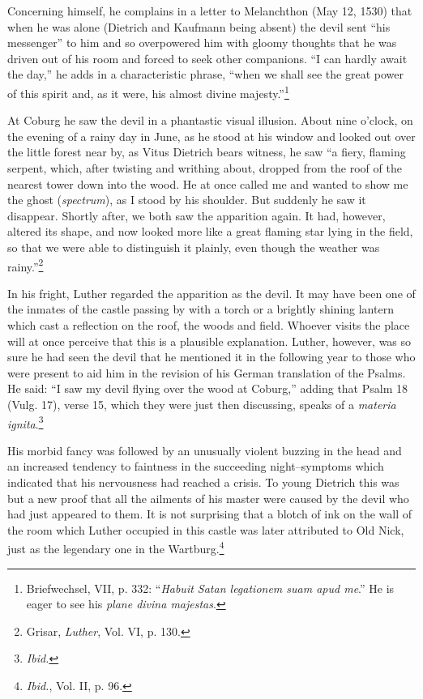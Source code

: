Concerning himself, he complains in a letter to Melanchthon (May
12, 1530) that when he was alone (Dietrich and Kaufmann being
absent) the devil sent “his messenger” to him and so overpowered him
with gloomy thoughts that he was driven out of his room and forced
to seek other companions. “I can hardly await the day,” he adds in a
characteristic phrase, “when we shall see the great power of this
spirit and, as it were, his almost divine majesty.”\footnote
{Briefwechsel, VII, p. 332: “\textit{Habuit Satan legationem suam apud me}.” He is eager to
see his \textit{plane divina majestas}.}

At Coburg he saw the devil in a phantastic visual illusion. About
nine o’clock, on the evening of a rainy day in June, as he stood at his
window and looked out over the little forest near by, as Vitus Dietrich
bears witness, he saw “a fiery, flaming serpent, which, after twisting
and writhing about, dropped from the roof of the nearest tower
down into the wood. He at once called me and wanted to show me
the ghost (\textit{spectrum}), as I stood by his shoulder. But suddenly he saw
it disappear. Shortly after, we both saw the apparition again. It had,
however, altered its shape, and now looked more like a great flaming
star lying in the field, so that we were able to distinguish it plainly,
even though the weather was rainy.”\footnote{Grisar, \textit{Luther}, Vol. VI, p. 130.}

In his fright, Luther regarded
the apparition as the devil. It may have been one of the inmates of the
castle passing by with a torch or a brightly shining lantern which cast
a reflection on the roof, the woods and field. Whoever visits the place
will at once perceive that this is a plausible explanation. Luther, however,
was so sure he had seen the devil that he mentioned it in the following
year to those who were present to aid him in the revision of his
German translation of the Psalms. He said: “I saw my devil flying
over the wood at Coburg,” adding that Psalm 18 (Vulg. 17), verse
15, which they were just then discussing, speaks of a \textit{materia ignita}.\footnote{\textit{Ibid.}}

His morbid fancy was followed by an unusually violent buzzing in
the head and an increased tendency to faintness in the succeeding
night--symptoms which indicated that his nervousness had reached
a crisis. To young Dietrich this was but a new proof that all the ailments
of his master were caused by the devil who had just appeared
to them. It is not surprising that a blotch of ink on the wall of the
room which Luther occupied in this castle was later attributed to Old
Nick, just as the legendary one in the Wartburg.\footnote{\textit{Ibid.}, Vol. II, p. 96.}

